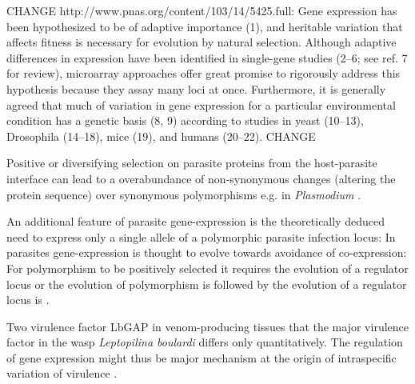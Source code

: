 CHANGE http://www.pnas.org/content/103/14/5425.full: Gene expression
has been hypothesized to be of adaptive importance (1), and heritable
variation that affects fitness is necessary for evolution by natural
selection. Although adaptive differences in expression have been
identified in single-gene studies (2–6; see ref. 7 for review),
microarray approaches offer great promise to rigorously address this
hypothesis because they assay many loci at once. Furthermore, it is
generally agreed that much of variation in gene expression for a
particular environmental condition has a genetic basis (8, 9)
according to studies in yeast (10–13), Drosophila (14–18), mice (19),
and humans (20–22).  CHANGE


Positive or diversifying selection on parasite proteins from the
host-parasite interface can lead to a overabundance of non-synonymous
changes (altering the protein sequence) over synonymous polymorphisms
e.g. in \textit{Plasmodium} \cite{pmid7630387}.

An additional feature of parasite gene-expression is the theoretically
deduced need to express only a single allele of a polymorphic parasite
infection locus: In parasites gene-expression is thought to evolve
towards avoidance of co-expression: For polymorphism to be positively
selected it requires the evolution of a regulator locus or the
evolution of polymorphism is followed by the evolution of a regulator
locus is \cite{pmid15913420}.

Two virulence factor LbGAP in venom-producing tissues that the major
virulence factor in the wasp \textit{Leptopilina boulardi} differs
only quantitatively. The regulation of gene expression might thus be
major mechanism at the origin of intraspecific variation of virulence
\cite{pmid21124871}.



     
